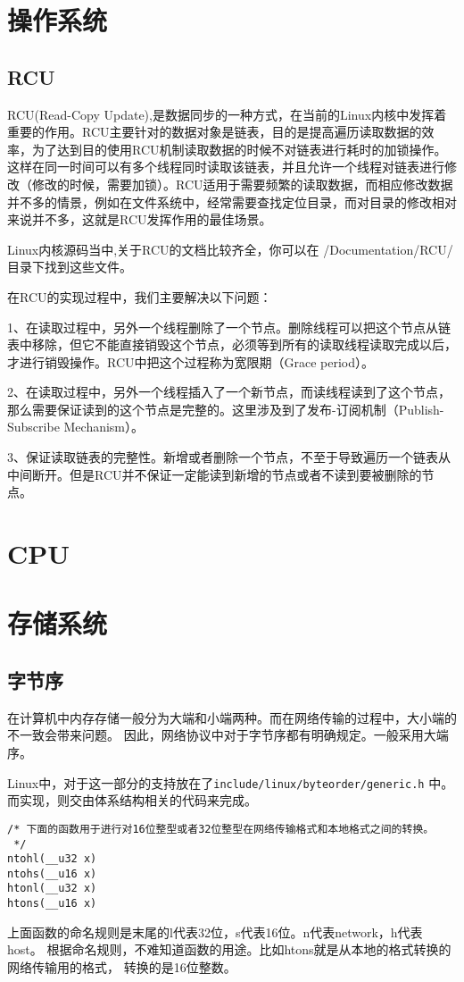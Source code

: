 	\section{操作系统}
		\subsection{RCU}
			RCU(Read-Copy Update),是数据同步的一种方式，在当前的Linux内核中发挥着重要的作用。RCU主要针对的数据对象是链表，目的是提高遍历读取数据的效率，为了达到目的使用RCU机制读取数据的时候不对链表进行耗时的加锁操作。这样在同一时间可以有多个线程同时读取该链表，并且允许一个线程对链表进行修改（修改的时候，需要加锁）。RCU适用于需要频繁的读取数据，而相应修改数据并不多的情景，例如在文件系统中，经常需要查找定位目录，而对目录的修改相对来说并不多，这就是RCU发挥作用的最佳场景。

			Linux内核源码当中,关于RCU的文档比较齐全，你可以在 /Documentation/RCU/ 目录下找到这些文件。

			在RCU的实现过程中，我们主要解决以下问题：

       			1、在读取过程中，另外一个线程删除了一个节点。删除线程可以把这个节点从链表中移除，但它不能直接销毁这个节点，必须等到所有的读取线程读取完成以后，才进行销毁操作。RCU中把这个过程称为宽限期（Grace period）。

       			2、在读取过程中，另外一个线程插入了一个新节点，而读线程读到了这个节点，那么需要保证读到的这个节点是完整的。这里涉及到了发布-订阅机制（Publish-Subscribe Mechanism）。

       			3、保证读取链表的完整性。新增或者删除一个节点，不至于导致遍历一个链表从中间断开。但是RCU并不保证一定能读到新增的节点或者不读到要被删除的节点。
	\section{CPU}
		
	\section{存储系统}
		\subsection{字节序}
			在计算机中内存存储一般分为大端和小端两种。而在网络传输的过程中，大小端的不一致会带来问题。
因此，网络协议中对于字节序都有明确规定。一般采用大端序。

			Linux中，对于这一部分的支持放在了\texttt{include/linux/byteorder/generic.h}
中。而实现，则交由体系结构相关的代码来完成。

\begin{verbatim}
/* 下面的函数用于进行对16位整型或者32位整型在网络传输格式和本地格式之间的转换。
 */
ntohl(__u32 x)
ntohs(__u16 x)
htonl(__u32 x)
htons(__u16 x)
\end{verbatim}

			上面函数的命名规则是末尾的l代表32位，s代表16位。n代表network，h代表host。
根据命名规则，不难知道函数的用途。比如htons就是从本地的格式转换的网络传输用的格式，
转换的是16位整数。
